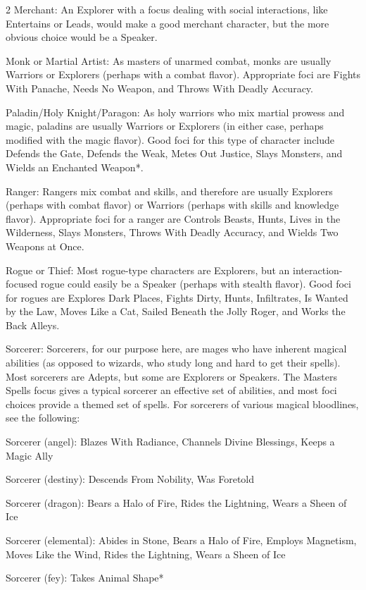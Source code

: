 \begin{multicols}{2}
Merchant: An Explorer with a focus dealing with social interactions, like Entertains or Leads, would make a good merchant character, but the more obvious choice would be a Speaker.

Monk or Martial Artist: As masters of unarmed combat, monks are usually Warriors or Explorers (perhaps with a combat flavor). Appropriate foci are Fights With Panache, Needs No Weapon, and Throws With Deadly Accuracy. 

Paladin/Holy Knight/Paragon: As holy warriors who mix martial prowess and magic, paladins are usually Warriors or Explorers (in either case, perhaps modified with the magic flavor). Good foci for this type of character include Defends the Gate, Defends the Weak, Metes Out Justice, Slays Monsters, and Wields an Enchanted Weapon*.

Ranger: Rangers mix combat and skills, and therefore are usually Explorers (perhaps with combat flavor) or Warriors (perhaps with skills and knowledge flavor). Appropriate foci for a ranger are Controls Beasts, Hunts, Lives in the Wilderness, Slays Monsters, Throws With Deadly Accuracy, and Wields Two Weapons at Once. 

Rogue or Thief: Most rogue-type characters are Explorers, but an interaction-focused rogue could easily be a Speaker (perhaps with stealth flavor). Good foci for rogues are Explores Dark Places, Fights Dirty, Hunts, Infiltrates, Is Wanted by the Law, Moves Like a Cat, Sailed Beneath the Jolly Roger, and Works the Back Alleys. 

Sorcerer: Sorcerers, for our purpose here, are mages who have inherent magical abilities (as opposed to wizards, who study long and hard to get their spells). Most sorcerers are Adepts, but some are Explorers or Speakers. The Masters Spells focus gives a typical sorcerer an effective set of abilities, and most foci choices provide a themed set of spells. For sorcerers of various magical bloodlines, see the following: 

Sorcerer (angel): Blazes With Radiance, Channels Divine Blessings, Keeps a Magic Ally 

Sorcerer (destiny): Descends From Nobility, Was Foretold

Sorcerer (dragon): Bears a Halo of Fire, Rides the Lightning, Wears a Sheen of Ice

Sorcerer (elemental): Abides in Stone, Bears a Halo of Fire, Employs Magnetism, Moves Like the Wind, Rides the Lightning, Wears a Sheen of Ice 

Sorcerer (fey): Takes Animal Shape* 


\end{multicols}
